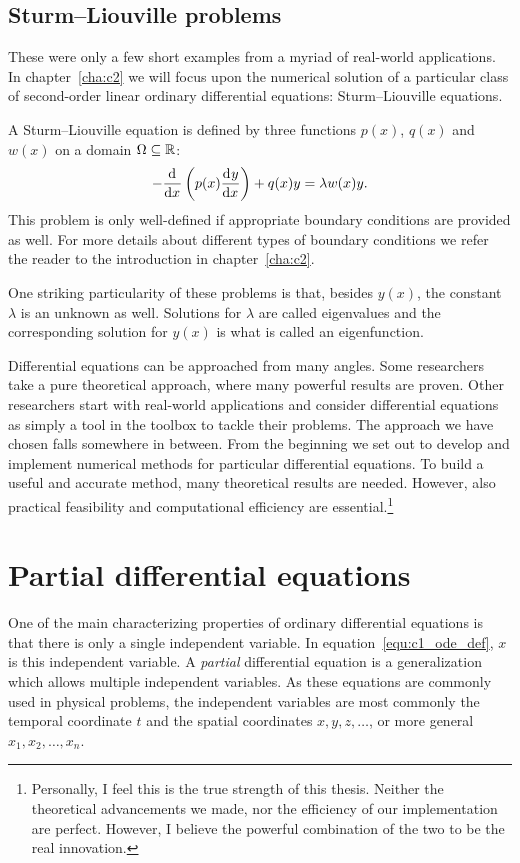 \subsection{Sturm--Liouville problems}

These were only a few short examples from a myriad of real-world applications. In chapter~\ref{cha:c2} we will focus upon the numerical solution of a particular class of second-order linear ordinary differential equations: Sturm--Liouville equations.

A Sturm--Liouville equation is defined by three functions $p(x)$, $q(x)$ and $w(x)$ on a domain $\Omega \subseteq \mathbb{R}$:
$$
    -{\dv[]{}{x}}\left(p(x) \dv[]{y}{x}\right) + q(x) y = \lambda w(x) y\text{.}
$$
This problem is only well-defined if appropriate boundary conditions are provided as well. For more details about different types of boundary conditions we refer the reader to the introduction in chapter~\ref{cha:c2}.

One striking particularity of these problems is that, besides $y(x)$, the constant $\lambda$ is an unknown as well. Solutions for $\lambda$ are called eigenvalues and the corresponding solution for $y(x)$ is what is called an eigenfunction.

Differential equations can be approached from many angles. Some researchers take a pure theoretical approach, where many powerful results are proven. Other researchers start with real-world applications and consider differential equations as simply a tool in the toolbox to tackle their problems. The approach we have chosen falls somewhere in between. From the beginning we set out to develop and implement numerical methods for particular differential equations. To build a useful and accurate method, many theoretical results are needed. However, also practical feasibility and computational efficiency are essential.\footnote{Personally, I feel this is the true strength of this thesis. Neither the theoretical advancements we made, nor the efficiency of our implementation are perfect. However, I believe the powerful combination of the two to be the real innovation.}


\section{Partial differential equations}

One of the main characterizing properties of ordinary differential equations is that there is only a single independent variable. In equation~\eqref{equ:c1_ode_def}, $x$ is this independent variable. A \emph{partial} differential equation is a generalization which allows multiple independent variables. As these equations are commonly used in physical problems, the independent variables are most commonly the temporal coordinate $t$ and the spatial coordinates $x, y, z, \dots$, or more general $x_1, x_2, \dots, x_n$.

